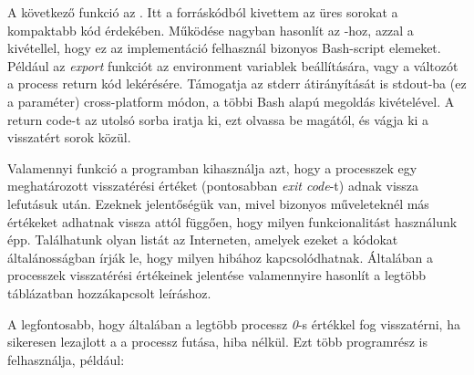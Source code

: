 A következő funkció az \texttt{}. Itt a forráskódból kivettem az üres sorokat a kompaktabb kód érdekében. Működése nagyban hasonlít az \texttt{}-hoz, azzal a kivétellel, hogy ez az implementáció felhasznál bizonyos Bash-script elemeket. Például az \textit{export} funkciót az environment variablek beállítására, vagy a \textit{} változót a process return kód lekérésére. Támogatja az stderr átirányítását is stdout-ba (ez a \texttt{} paraméter) cross-platform módon, a többi Bash alapú megoldás kivételével. A return code-t az utolsó sorba iratja ki, ezt olvassa be magától, és vágja ki a visszatért sorok közül.

\pagebreak
{}
Valamennyi funkció a programban kihasználja azt, hogy a processzek egy meghatározott visszatérési értéket (pontosabban \textit{exit code}-t) adnak vissza lefutásuk után. Ezeknek jelentőségük van, mivel bizonyos műveleteknél más értékeket adhatnak vissza attól függően, hogy milyen funkcionalitást használunk épp. Találhatunk olyan listát az Interneten, amelyek ezeket a kódokat általánosságban írják le, hogy milyen hibához kapcsolódhatnak. 
Általában a processzek visszatérési értékeinek jelentése valamennyire hasonlít a legtöbb táblázatban hozzákapcsolt leíráshoz. \cite{linux_exitcodes}

A legfontosabb, hogy általában a legtöbb processz \textit{0}-s értékkel fog visszatérni, ha sikeresen lezajlott a a processz futása, hiba nélkül. Ezt több programrész is felhasználja, például:

